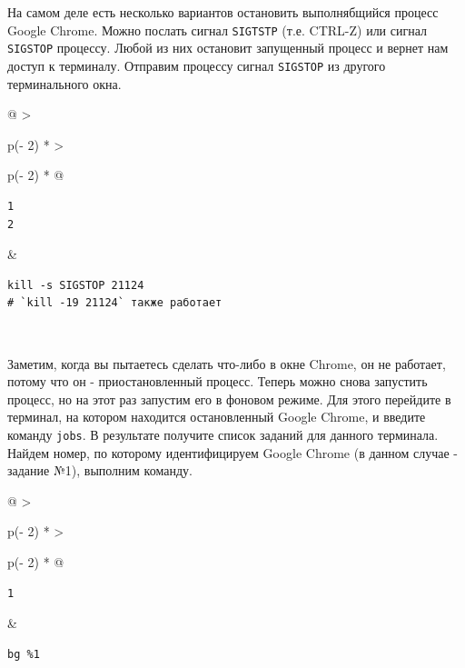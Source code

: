 \documentclass{report}
\begin{document}
На самом деле есть несколько вариантов остановить выполнябщийся процесс
Google Chrome. Можно послать сигнал \texttt{SIGTSTP} (т.е. CTRL-Z) или
сигнал \texttt{SIGSTOP} процессу. Любой из них остановит запущенный
процесс и вернет нам доступ к терминалу. Отправим процессу сигнал
\texttt{SIGSTOP} из другого терминального окна.

\begin{longtable}[]{@{}
  >{\raggedright\arraybackslash}p{(\columnwidth - 2\tabcolsep) * }
  >{\raggedright\arraybackslash}p{(\columnwidth - 2\tabcolsep) * }@{}}
\toprule
\endhead
\begin{minipage}[t]{\linewidth}\raggedright
\begin{verbatim}
1
2
\end{verbatim}
\end{minipage} & \begin{minipage}[t]{\linewidth}\raggedright
\begin{verbatim}
kill -s SIGSTOP 21124
# `kill -19 21124` также работает
\end{verbatim}
\end{minipage} \\ \addlinespace
\bottomrule
\end{longtable}

Заметим, когда вы пытаетесь сделать что-либо в окне Chrome, он не
работает, потому что он - приостановленный процесс. Теперь можно снова
запустить процесс, но на этот раз запустим его в фоновом режиме. Для
этого перейдите в терминал, на котором находится остановленный Google
Chrome, и введите команду \texttt{jobs}. В результате получите список
заданий для данного терминала. Найдем номер, по которому идентифицируем
Google Chrome (в данном случае - задание №1), выполним команду.

\begin{longtable}[]{@{}
  >{\raggedright\arraybackslash}p{(\columnwidth - 2\tabcolsep) * }
  >{\raggedright\arraybackslash}p{(\columnwidth - 2\tabcolsep) * }@{}}
\toprule
\endhead
\begin{minipage}[t]{\linewidth}\raggedright
\begin{verbatim}
1
\end{verbatim}
\end{minipage} & \begin{minipage}[t]{\linewidth}\raggedright
\begin{verbatim}
bg %1
\end{verbatim}
\end{minipage} \\ \addlinespace
\bottomrule
\end{longtable}
\end{document}

